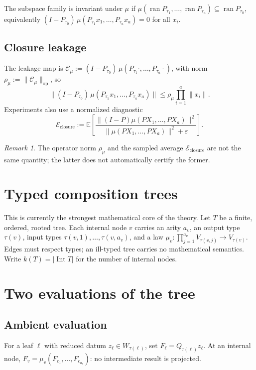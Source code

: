 \documentclass[11pt]{amsart}
\theoremstyle{definition}
\theoremstyle{remark}
\newtheorem{remark}[theorem]{Remark}
\DeclareMathOperator{\ran}{ran}
\DeclareMathOperator{\Int}{Int}
\DeclareMathOperator{\op}{op}
\begin{document}
The subspace family is invariant under $\mu$ if
$\mu(\ran P_{\tau_1},\ldots,\ran P_{\tau_a}) \subseteq \ran P_{\tau_0}$,
equivalently
$(I-P_{\tau_0})\,\mu(P_{\tau_1}x_1,\ldots,P_{\tau_a}x_a)=0$ for all
$x_i$.

\subsection{Closure leakage}

The leakage map is
$\mathcal C_\mu := (I-P_{\tau_0})\,\mu(P_{\tau_1}\cdot,\ldots,P_{\tau_a}\cdot)$,
with norm $\rho_\mu := \lVert\mathcal C_\mu\rVert_{\op}$, so
\[
\bigl\lVert (I-P_{\tau_0})\,\mu(P_{\tau_1}x_1,\ldots,P_{\tau_a}x_a)\bigr\rVert
\le \rho_\mu \prod_{i=1}^{a}\lVert x_i\rVert.
\]
Experiments also use a normalized diagnostic
\[
\mathcal E_{\mathrm{closure}} := \mathbb E\left[\frac{\lVert(I-P)\mu(PX_1,\ldots,PX_a)\rVert^2}
{\lVert\mu(PX_1,\ldots,PX_a)\rVert^2+\varepsilon}\right].
\]

\begin{remark}
The operator norm $\rho_\mu$ and the sampled average
$\mathcal E_{\mathrm{closure}}$ are not the same quantity; the latter
does not automatically certify the former.
\end{remark}

\section{Typed composition trees}

This is currently the strongest mathematical core of the theory. Let
$T$ be a finite, ordered, rooted tree. Each internal node $v$ carries
an arity $a_v$, an output type $\tau(v)$, input types
$\tau(v,1),\ldots,\tau(v,a_v)$, and a law
$\mu_v : \prod_{j=1}^{a_v}V_{\tau(v,j)} \to V_{\tau(v)}$. Edges must
respect types; an ill-typed tree carries no mathematical semantics.
Write $k(T) = \lvert \Int T\rvert$ for the number of internal nodes.

\section{Two evaluations of the tree}

\subsection{Ambient evaluation}

For a leaf $\ell$ with reduced datum $z_\ell \in W_{\tau(\ell)}$, set
$F_\ell = Q_{\tau(\ell)}z_\ell$. At an internal node,
$F_v = \mu_v(F_{c_1},\ldots,F_{c_{a_v}})$: no intermediate result is
projected.
\end{document}
